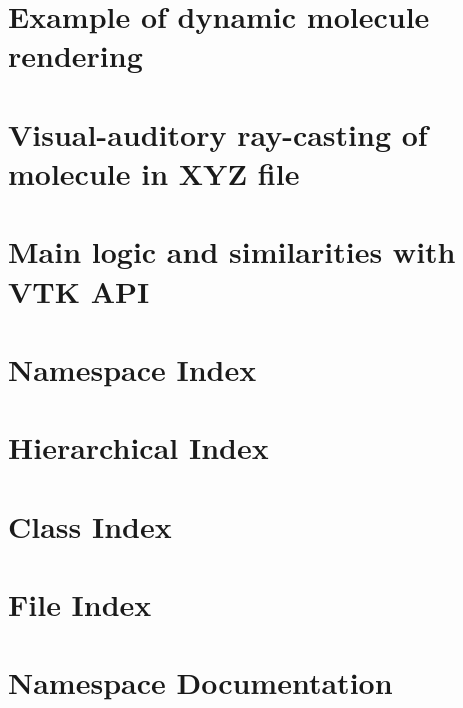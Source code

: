 \let\mypdfximage\pdfximage\def\pdfximage{\immediate\mypdfximage}\documentclass[twoside]{book}
\newcommand{\+}{\discretionary{\mbox{\scriptsize$\hookleftarrow$}}{}{}}
\begin{document}
\chapter{Example of dynamic molecule rendering}
\label{md_core_src_doc_molecule_pipeline}

\chapter{Visual-\/auditory ray-\/casting of molecule in X\+YZ file}
\label{md_core_src_doc_va_molecule_raycast}

\chapter{Main logic and similarities with V\+TK A\+PI}
\label{md_core_src_doc_vtkstyle}

\chapter{Namespace Index}

\chapter{Hierarchical Index}

\chapter{Class Index}

\chapter{File Index}

\chapter{Namespace Documentation}

\end{document}

